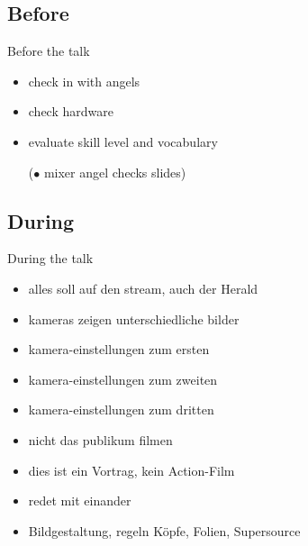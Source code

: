 \documentclass[hyperref={pdfpagelabels=false}]{beamer}
\begin{document}
\subsection{Before}
\begin{frame}{Before the talk}
\begin{itemize} %
\item check in with angels %
\item check hardware %
\item evaluate skill level and vocabulary %
\item [($\bullet$] mixer angel checks slides) %
\end{itemize} 
\end{frame}


\subsection{During} %
\begin{frame}{During the talk}
\begin{itemize}
\item alles soll auf den stream, auch der Herald
\item  kameras zeigen unterschiedliche bilder 
\item  kamera-einstellungen zum ersten
\item  kamera-einstellungen zum zweiten
\item  kamera-einstellungen zum dritten
\item  nicht das publikum filmen
\item  dies ist ein Vortrag, kein Action-Film 
\item  redet mit einander 
\item  Bildgestaltung, regeln  Köpfe, Folien, Supersource
\end{itemize} 
\end{frame}
\end{document}

